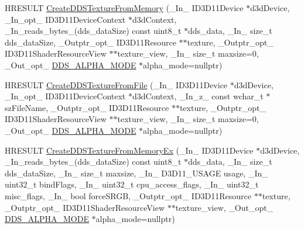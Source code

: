 \begin{DoxyCompactItemize}
\item 
H\+R\+E\+S\+U\+LT \hyperlink{namespacemage_a9005e298930545563b03a7fa18af9eb6}{Create\+D\+D\+S\+Texture\+From\+Memory} (\+\_\+\+In\+\_\+ I\+D3\+D11\+Device $\ast$d3d\+Device, \+\_\+\+In\+\_\+opt\+\_\+ I\+D3\+D11\+Device\+Context $\ast$d3d\+Context, \+\_\+\+In\+\_\+reads\+\_\+bytes\+\_\+(dds\+\_\+data\+Size) const uint8\+\_\+t $\ast$dds\+\_\+data, \+\_\+\+In\+\_\+ size\+\_\+t dds\+\_\+data\+Size, \+\_\+\+Outptr\+\_\+opt\+\_\+ I\+D3\+D11\+Resource $\ast$$\ast$texture, \+\_\+\+Outptr\+\_\+opt\+\_\+ I\+D3\+D11\+Shader\+Resource\+View $\ast$$\ast$texture\+\_\+view, \+\_\+\+In\+\_\+ size\+\_\+t maxsize=0, \+\_\+\+Out\+\_\+opt\+\_\+ \hyperlink{namespacemage_a0c586a2bad862f4858900ca121ca80c2}{D\+D\+S\+\_\+\+A\+L\+P\+H\+A\+\_\+\+M\+O\+DE} $\ast$alpha\+\_\+mode=nullptr)
\item 
H\+R\+E\+S\+U\+LT \hyperlink{namespacemage_aad2679951c2320a1e68d9923a47a2828}{Create\+D\+D\+S\+Texture\+From\+File} (\+\_\+\+In\+\_\+ I\+D3\+D11\+Device $\ast$d3d\+Device, \+\_\+\+In\+\_\+opt\+\_\+ I\+D3\+D11\+Device\+Context $\ast$d3d\+Context, \+\_\+\+In\+\_\+z\+\_\+ const wchar\+\_\+t $\ast$sz\+File\+Name, \+\_\+\+Outptr\+\_\+opt\+\_\+ I\+D3\+D11\+Resource $\ast$$\ast$texture, \+\_\+\+Outptr\+\_\+opt\+\_\+ I\+D3\+D11\+Shader\+Resource\+View $\ast$$\ast$texture\+\_\+view, \+\_\+\+In\+\_\+ size\+\_\+t maxsize=0, \+\_\+\+Out\+\_\+opt\+\_\+ \hyperlink{namespacemage_a0c586a2bad862f4858900ca121ca80c2}{D\+D\+S\+\_\+\+A\+L\+P\+H\+A\+\_\+\+M\+O\+DE} $\ast$alpha\+\_\+mode=nullptr)
\item 
H\+R\+E\+S\+U\+LT \hyperlink{namespacemage_acb0dc8616d42bd8c67d22d6274580cb7}{Create\+D\+D\+S\+Texture\+From\+Memory\+Ex} (\+\_\+\+In\+\_\+ I\+D3\+D11\+Device $\ast$d3d\+Device, \+\_\+\+In\+\_\+reads\+\_\+bytes\+\_\+(dds\+\_\+data\+Size) const uint8\+\_\+t $\ast$dds\+\_\+data, \+\_\+\+In\+\_\+ size\+\_\+t dds\+\_\+data\+Size, \+\_\+\+In\+\_\+ size\+\_\+t maxsize, \+\_\+\+In\+\_\+ D3\+D11\+\_\+\+U\+S\+A\+GE usage, \+\_\+\+In\+\_\+ uint32\+\_\+t bind\+Flags, \+\_\+\+In\+\_\+ uint32\+\_\+t cpu\+\_\+access\+\_\+flags, \+\_\+\+In\+\_\+ uint32\+\_\+t misc\+\_\+flags, \+\_\+\+In\+\_\+ bool force\+S\+R\+GB, \+\_\+\+Outptr\+\_\+opt\+\_\+ I\+D3\+D11\+Resource $\ast$$\ast$texture, \+\_\+\+Outptr\+\_\+opt\+\_\+ I\+D3\+D11\+Shader\+Resource\+View $\ast$$\ast$texture\+\_\+view, \+\_\+\+Out\+\_\+opt\+\_\+ \hyperlink{namespacemage_a0c586a2bad862f4858900ca121ca80c2}{D\+D\+S\+\_\+\+A\+L\+P\+H\+A\+\_\+\+M\+O\+DE} $\ast$alpha\+\_\+mode=nullptr)
\item 

\end{DoxyCompactItemize}

